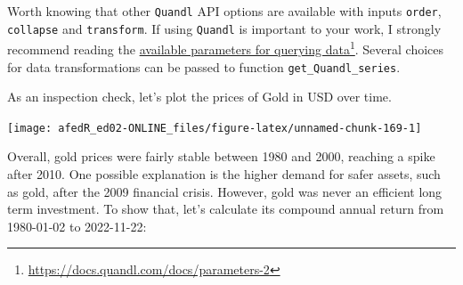 \documentclass[
  12pt,
]{book}
\newenvironment{Shaded}{\begin{snugshade}}{\end{snugshade}}
\newcommand{\AttributeTok}[1]{\textcolor[rgb]{0.61,0.61,0.61}{#1}}
\newcommand{\CommentTok}[1]{\textcolor[rgb]{0.37,0.37,0.37}{\textit{#1}}}
\newcommand{\DecValTok}[1]{\textcolor[rgb]{0.06,0.06,0.06}{#1}}
\newcommand{\FunctionTok}[1]{\textcolor[rgb]{0,0,0}{#1}}
\newcommand{\NormalTok}[1]{#1}
\newcommand{\OtherTok}[1]{\textcolor[rgb]{0.37,0.37,0.37}{#1}}
\newcommand{\SpecialCharTok}[1]{\textcolor[rgb]{0,0,0}{#1}}
\newcommand{\StringTok}[1]{\textcolor[rgb]{0.5,0.5,0.5}{#1}}
\begin{document}
Worth knowing that other \texttt{Quandl} API options are available with inputs \texttt{order}, \texttt{collapse} and \texttt{transform}. If using \texttt{Quandl} is important to your work, I strongly recommend reading the \href{https://docs.quandl.com/docs/parameters-2}{available parameters for querying data}\footnote{\url{https://docs.quandl.com/docs/parameters-2}}. Several choices for data transformations can be passed to function \texttt{get\_Quandl\_series}.

As an inspection check, let's plot the prices of Gold in USD over time.

\begin{center}\texttt{[image: afedR\_ed02-ONLINE\_files/figure-latex/unnamed-chunk-169-1]} \end{center}

Overall, gold prices were fairly stable between 1980 and 2000, reaching a spike after 2010. One possible explanation is the higher demand for safer assets, such as gold, after the 2009 financial crisis. However, gold was never an efficient long term investment. To show that, let's calculate its compound annual return from 1980-01-02 to 2022-11-22:

\begin{Shaded}
\end{Shaded}
\end{document}
